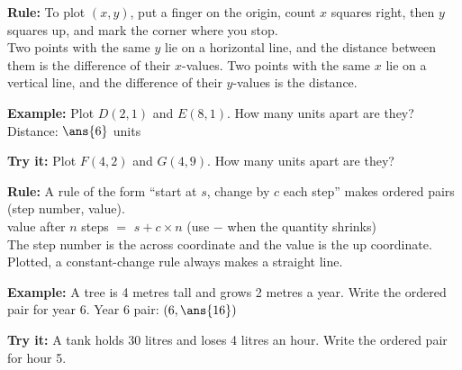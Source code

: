 \documentclass[12pt]{article}
\begin{document}

\begin{formulabox}
\textbf{Rule:} To plot $(x, y)$, put a finger on the origin, count $x$ squares right, then $y$ squares up, and mark the corner where you stop.\\[3pt]
Two points with the same $y$ lie on a horizontal line, and the distance between them is the difference of their $x$-values. Two points with the same $x$ lie on a vertical line, and the difference of their $y$-values is the distance.
\end{formulabox}

\begin{examplebox}
\textbf{Example:} \quad Plot $D(2, 1)$ and $E(8, 1)$. How many units apart are they?
Distance: $\ans{6}$ units
\end{examplebox}

\begin{tryitbox}
\textbf{Try it:} \quad Plot $F(4, 2)$ and $G(4, 9)$. How many units apart are they?\\[2pt]
\end{tryitbox}


\begin{formulabox}
\textbf{Rule:} A rule of the form ``start at $s$, change by $c$ each step'' makes ordered pairs (step number, value).\\[3pt]
value after $n$ steps $=$ $s + c \times n$ \quad (use $-$ when the quantity shrinks)\\[3pt]
The step number is the across coordinate and the value is the up coordinate. Plotted, a constant-change rule always makes a straight line.
\end{formulabox}

\begin{examplebox}
\textbf{Example:} \quad A tree is 4 metres tall and grows 2 metres a year. Write the ordered pair for year 6.
Year 6 pair: $(6, \ans{16})$
\end{examplebox}

\begin{tryitbox}
\textbf{Try it:} \quad A tank holds 30 litres and loses 4 litres an hour. Write the ordered pair for hour 5.\\[2pt]
\end{tryitbox}
\end{document}
